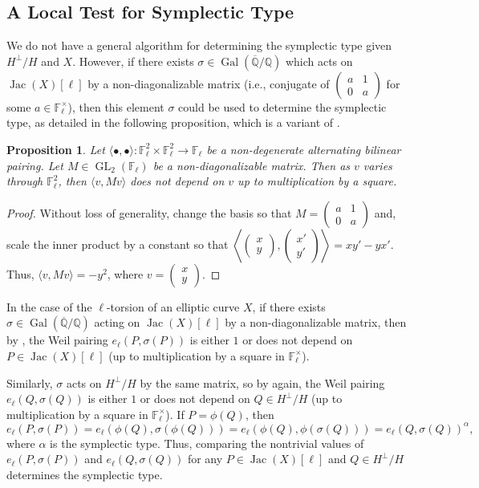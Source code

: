 \documentclass{amsproc}
\numberwithin{equation}{section}
\newtheorem{proposition}[equation]{Proposition}
\theoremstyle{definition}
\theoremstyle{remark}
\DeclareMathOperator{\Jac}{Jac}
\DeclareMathOperator{\GL}{GL}
\DeclareMathOperator{\Gal}{Gal}
\newcommand{\QQ}{\mathbb Q}
\newcommand{\FF}{\mathbb F}
\newcommand{\Qbar}{\overline{\QQ}}
\newcommand{\GalQ}{\Gal(\Qbar/\QQ)}
\newcommand{\ttwomatrix}[4]{\left(\begin{smallmatrix} #1 & #2 \\ #3 & #4\end{smallmatrix}\right)}
\newcommand{\ttwovector}[2]{\left(\begin{smallmatrix} #1 \\ #2\end{smallmatrix}\right)}
\begin{document}
\subsection{A Local Test for Symplectic Type}
\label{subsec:symplectic_test_description}
We do not have a general algorithm for determining the symplectic type given $H^\perp/H$ and $X$. However, if there exists $\sigma\in\GalQ$ which acts on $\Jac(X)[\ell]$ by a non-diagonalizable matrix (i.e., conjugate of $\ttwomatrix a10a$ for some $a\in\FF_\ell^\times$), then this element $\sigma$ could be used to determine the symplectic type, as detailed in the following proposition, which is a variant of \cite[Thm.~16]{local_symplectic_type}.
\begin{proposition}
    \label{prop:symplectic_condition}
    Let $\langle\bullet,\bullet\rangle : \FF_\ell^2\times\FF_\ell^2 \to \FF_\ell$ be a non-degenerate alternating bilinear pairing. Let $M\in\GL_2(\FF_\ell)$ be a non-diagonalizable matrix. Then as $v$ varies through $\FF_\ell^2$, then $\langle v, Mv\rangle$ does not depend on $v$ up to multiplication by a square.
\end{proposition}
\begin{proof}
    Without loss of generality, change the basis so that $M = \ttwomatrix a10a$ and, scale the inner product by a constant so that $\left\langle \ttwovector{x}{y}, 
    \left(\begin{smallmatrix} x' \\[-2pt] y' \end{smallmatrix}\right)
    \right\rangle = xy'-yx'$.
    Thus, $\langle v, Mv\rangle = -y^2$, where $v = \ttwovector xy$.
\end{proof}
In the case of the $\ell$-torsion of an elliptic curve $X$, if there exists $\sigma\in\GalQ$ acting on $\Jac(X)[\ell]$ by a non-diagonalizable matrix, then by , the Weil pairing $e_\ell(P, \sigma(P))$ is either $1$ or does not depend on $P\in\Jac(X)[\ell]$ (up to multiplication by a square in $\FF_\ell^\times$).

Similarly, $\sigma$ acts on $H^\perp/H$ by the same matrix, so by  again, the Weil pairing $e_\ell(Q,\sigma(Q))$ is either $1$ or does not depend on $Q\in H^\perp/H$ (up to multiplication by a square in $\FF_\ell^\times$). If $P = \phi(Q)$, then
\begin{equation}
\label{eq:symplectic_type_relation}
e_\ell(P,\sigma(P)) = e_\ell(\phi(Q), \sigma(\phi(Q)))
= e_\ell(\phi(Q), \phi(\sigma(Q))) = e_\ell(Q,\sigma(Q))^\alpha,
\end{equation}
where $\alpha$ is the symplectic type. Thus, comparing the nontrivial values of $e_\ell(P,\sigma(P))$ and $e_\ell(Q,\sigma(Q))$ for any $P\in\Jac(X)[\ell]$ and $Q\in H^\perp/H$ determines the symplectic type.
\end{document}
